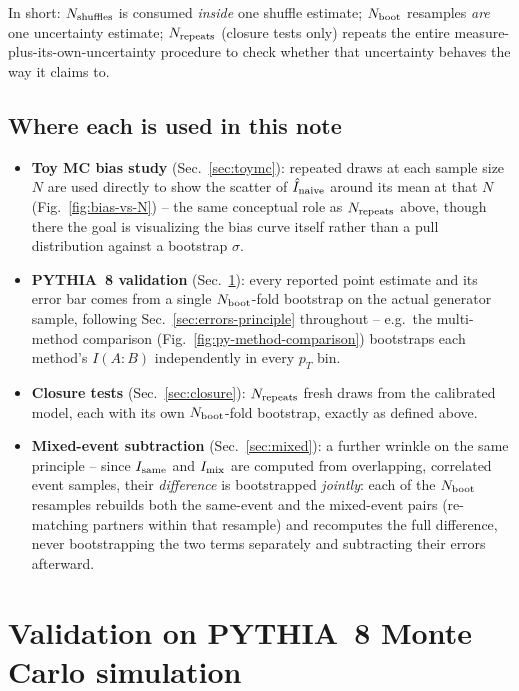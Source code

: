 \documentclass[11pt]{article}
\begin{document}
In short: $N_{\rm shuffles}$ is consumed \emph{inside} one shuffle
estimate; $N_{\rm boot}$ resamples \emph{are} one uncertainty estimate;
$N_{\rm repeats}$ (closure tests only) repeats the entire
measure-plus-its-own-uncertainty procedure to check whether that
uncertainty behaves the way it claims to.

\subsection{Where each is used in this note}

\begin{itemize}
\item \textbf{Toy MC bias study} (Sec.~\ref{sec:toymc}): repeated draws
at each sample size $N$ are used directly to show the scatter of
$\hat I_{\rm naive}$ around its mean at that $N$ (Fig.~\ref{fig:bias-vs-N})
-- the same conceptual role as $N_{\rm repeats}$ above, though there the
goal is visualizing the bias curve itself rather than a pull distribution
against a bootstrap $\sigma$.
\item \textbf{PYTHIA~8 validation} (Sec.~\ref{sec:pythia}): every
reported point estimate and its error bar comes from a single
$N_{\rm boot}$-fold bootstrap on the actual generator sample, following
Sec.~\ref{sec:errors-principle} throughout -- e.g.\ the multi-method
comparison (Fig.~\ref{fig:py-method-comparison}) bootstraps each method's
$I(A{:}B)$ independently in every $p_T$ bin.
\item \textbf{Closure tests} (Sec.~\ref{sec:closure}): $N_{\rm repeats}$
fresh draws from the calibrated model, each with its own
$N_{\rm boot}$-fold bootstrap, exactly as defined above.
\item \textbf{Mixed-event subtraction} (Sec.~\ref{sec:mixed}): a further
wrinkle on the same principle -- since $I_{\rm same}$ and $I_{\rm mix}$
are computed from overlapping, correlated event samples, their
\emph{difference} is bootstrapped \emph{jointly}: each of the
$N_{\rm boot}$ resamples rebuilds both the same-event and the mixed-event
pairs (re-matching partners within that resample) and recomputes the
full difference, never bootstrapping the two terms separately and
subtracting their errors afterward.
\end{itemize}

\section{Validation on PYTHIA~8 Monte Carlo simulation}
\label{sec:pythia}
\end{document}
